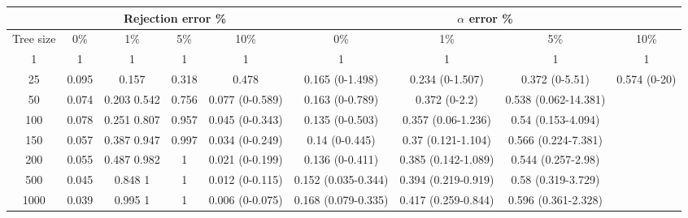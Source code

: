 \begin{tabular}{ccccccccc}
  \hline
  & \multicolumn{4}{c}{Rejection error \%} & \multicolumn{4}{c}{$\alpha$ error \%} \\
  \hline
  Tree size    &    0\% & 1\%  & 5\%  &  10\%   &    0\% & 1\%  & 5\%  &  10\% \\
  \hline
  1 & 1 & 1 & 1 & 1 & 1 & 1 & 1 & 1 \\
  25   &    0.095     &    0.157  & 0.318     &    0.478     &    0.165 (0-1.498)     &    0.234 (0-1.507)     &    0.372 (0-5.51) &    0.574 (0-20)   \\

  50   &    0.074     &    0.203          0.542     &    0.756     &    0.077 (0-0.589)     &    0.163 (0-0.789)     &    0.372 (0-2.2)  &    0.538 (0.062-14.381)     \\
  100  &    0.078     &    0.251          0.807     &    0.957     &    0.045 (0-0.343)     &    0.135 (0-0.503)     &    0.357 (0.06-1.236)  &    0.54 (0.153-4.094)  \\
  150  &    0.057     &    0.387          0.947     &    0.997     &    0.034 (0-0.249)     &    0.14 (0-0.445) &    0.37 (0.121-1.104)  &    0.566 (0.224-7.381) \\
  200  &    0.055     &    0.487          0.982     &    1    &    0.021 (0-0.199)     &    0.136 (0-0.411)     &    0.385 (0.142-1.089) &    0.544 (0.257-2.98)  \\
  500  &    0.045     &    0.848          1    &    1    &    0.012 (0-0.115)     &    0.152 (0.035-0.344) &    0.394 (0.219-0.919) &    0.58 (0.319-3.729)  \\
  1000 &    0.039     &    0.995          1    &    1    &    0.006 (0-0.075)     &    0.168 (0.079-0.335) &    0.417 (0.259-0.844) &    0.596 (0.361-2.328) \\
  \hline
\end{tabular}